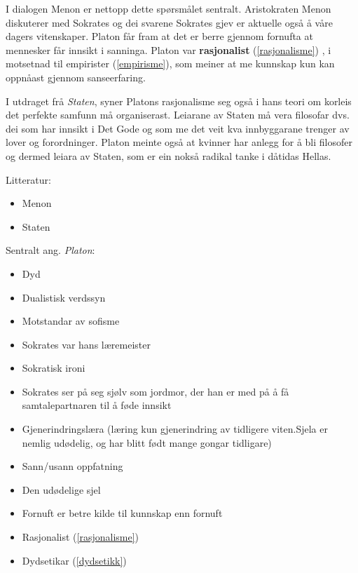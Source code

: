 \documentclass[a4paper]{IEEEtran}
\begin{document}
I dialogen Menon er nettopp dette spørsmålet sentralt. Aristokraten Menon diskuterer med Sokrates og dei svarene Sokrates gjev er aktuelle også å våre dagers vitenskaper. Platon får fram at det er berre gjennom fornufta at mennesker får innsikt i sanninga. Platon var \textbf{rasjonalist} (\ref{rasjonalisme}) , i motsetnad til empirister (\ref{empirisme}), som meiner at me kunnskap kun kan oppnåast gjennom sanseerfaring.\bigskip

I utdraget frå \textit{Staten}, syner Platons rasjonalisme seg også i hans teori om korleis det perfekte samfunn må organiserast. Leiarane av Staten må vera filosofar dvs. dei som har innsikt i Det Gode og som me det veit kva innbyggarane trenger av lover og forordninger. Platon meinte også at kvinner har anlegg for å bli filosofer og dermed leiara av Staten, som er ein nokså radikal tanke i dåtidas Hellas.\bigskip

\begin{center}
Litteratur:    
\end{center}

\begin{itemize}
    \item Menon
    \item Staten
\end{itemize}\bigskip 

\begin{center}
Sentralt ang. \textit{Platon}:    
\end{center}

\begin{itemize}
    \bigskip
    
    \item Dyd
    \item Dualistisk verdssyn
    \item Motstandar av sofisme
    \item Sokrates var hans læremeister
    \item Sokratisk ironi
    \item Sokrates ser på seg sjølv som jordmor, der han er med på å få samtalepartnaren til å føde innsikt
    \item Gjenerindringslæra (læring kun gjenerindring av tidligere viten.Sjela er nemlig udødelig, og har blitt født mange gongar tidligare)
    \item Sann/usann oppfatning
    \item Den udødelige sjel
    \item Fornuft er betre kilde til kunnskap enn fornuft
    \item Rasjonalist (\ref{rasjonalisme})
    \item Dydsetikar (\ref{dydsetikk})
     
\end{itemize}\bigskip
\end{document}
